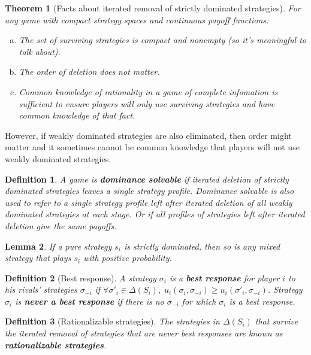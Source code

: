 \documentclass[letter, 11pt]{article}
\theoremstyle{basic}
\newtheorem{definition}{Definition}[section]
\newtheorem{theorem}{Theorem}[section]
\newtheorem{lemma}[theorem]{Lemma}
\begin{document}
\begin{spacing}{1.0}
\begin{theorem}[Facts about iterated removal of strictly dominated
  strategies]
  For any game with compact strategy spaces and continuous payoff functions:
  \begin{enumerate}[a)]\leftskip = 1em
  \item The set of surviving strategies is compact and
    nonempty (so it's meaningful to talk about).
  \item The order of deletion does not matter.
  \item Common knowledge of rationality in a game of complete infomation is
    sufficient to ensure players will only use surviving strategies and
    have common knowledge of that fact.
  \end{enumerate}
\end{theorem}

However, if weakly dominated strategies are also eliminated, then
order might matter and it sometimes cannot be common knowledge that players
will not use weakly dominated strategies.

\begin{definition}
  A game is \textbf{dominance solvable} if iterated deletion of strictly dominated
  strategies leaves a single strategy profile. Dominance solvable is also used to
  refer to a single strategy profile left after iterated deletion of all weakly
  dominated strategies at each stage. Or if all profiles of strategies left after
  iterated deletion give the same payoffs.
\end{definition}

\begin{lemma}
  If a pure strategy $s_i$ is strictly dominated, then so is any mixed
  strategy that plays $s_i$ with positive probability.
\end{lemma}

\begin{definition}[Best response]
  A strategy $\sigma_i$ is a \textbf{best response} for
  player $i$ to his rivals' strategies $\sigma_{-i}$ if $\forall \sigma'_i
  \in \Delta(S_i),\; u_i(\sigma_i, \sigma_{-i}) \geq u_i(\sigma'_i,
  \sigma_{-i})$. Strategy $\sigma_i$ is \textbf{never a best response} if
  there is no $\sigma_{-i}$ for which $\sigma_i$ is a best response.
\end{definition}

\begin{definition}[Rationalizable strategies]
  The strategies in $\Delta(S_i)$ that survive
  the iterated removal of strategies that are never best responses are
  known as \textbf{rationalizable strategies}.
\end{definition}


\end{spacing}
\end{document}
